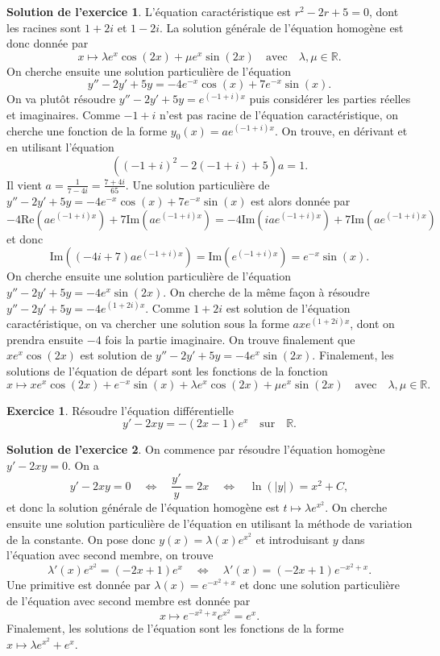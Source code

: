 \documentclass[a4paper, 11pt,openany]{article}%
\theoremstyle{plain}
\theoremstyle{definition}
\newtheorem{exo}{Exercice}
\newtheorem{sol}{Solution de l'exercice}
\theoremstyle{remark}
\newcommand{\R}{\mathbb{R}}
\begin{document}
\begin{sol}
L'équation caractéristique est $r^2-2r+5=0$, dont les racines sont $1+2i$ et $1-2i$. La solution générale de l'équation homogène est donc donnée par \[ x \mapsto \lambda e^x \cos(2x)+ \mu e^x \sin(2x) \quad \text{avec} \quad  \lambda, \mu \in \R.\]
On cherche ensuite une solution particulière de l'équation 
\[y''-2y'+5y=-4e^{-x} \cos(x)+7e^{- x} \sin(x).\]
On va plutôt résoudre $y''-2y'+5y=e^{(-1+i)x}$ puis considérer les parties réelles et imaginaires. Comme $-1+i$ n'est pas racine de l'équation caractéristique, on cherche une fonction de la forme $y_0(x)=ae^{(-1+i)x}$. On trouve, en dérivant et en utilisant l'équation 
\[ ((-1+i)^2-2(-1+i)+5)a=1.\]
Il vient $a=\frac{1}{7-4i}=\frac{7+4i}{65}$. Une solution particulière de $y''-2y'+5y=-4e^{-x} \cos(x)+7e^{-x} \sin(x)$ est alors donnée par \[ -4 \text{Re}(ae^{(-1+i)x})+7 \text{Im}(ae^{(-1+i)x})=-4 \text{Im}(iae^{(-1+i)x})+7\text{Im}(ae^{(-1+i)x})\]
et donc
\[  \text{Im}((-4i+7)ae^{(-1+i)x}) = \text{Im}(e^{(-1+i)x})=e^{-x} \sin(x).\] On cherche ensuite une solution particulière de l'équation $y''-2y' +5y= -4e^x \sin(2x)$. On cherche de la même façon à résoudre $y''-2y'+5y=-4e^{(1+2i)x}$. Comme $1+2i$ est solution de l'équation caractéristique, on va chercher une solution sous la forme $axe^{(1+2i)x}$, dont on prendra ensuite $-4$ fois la partie imaginaire. On trouve finalement que $xe^x \cos(2x)$ est solution de $y''-2y' +5y= -4e^x \sin(2x)$. Finalement, les solutions de l'équation de départ sont les fonctions de la fonction
\[ x \mapsto xe^x \cos(2x) + e^{-x} \sin(x) + \lambda e^x \cos(2x) + \mu e^{x} \sin(2x) \quad \text{avec} \quad \lambda, \mu \in \R.\]
\end{sol}


\begin{exo}
Résoudre l'équation différentielle
\[ y'-2xy = -(2x-1)e^x \quad \text{sur} \quad \R.\]
\end{exo}

\begin{sol}
On commence par résoudre l'équation homogène $y'-2xy=0$. On a 
\[ y'- 2xy=0 \quad \Leftrightarrow \quad \frac{y'}{y} =2x \quad \Leftrightarrow \quad \ln(|y|)=x^2+C,\]
et donc la solution générale de l'équation homogène est $t \mapsto \lambda e^{x^2}$. On cherche ensuite une solution particulière de l'équation en utilisant la méthode de variation de la constante. On pose donc $y(x)= \lambda(x)e^{x^2}$ et introduisant $y$ dans l'équation avec second membre, on trouve 
\[ \lambda'(x)e^{x^2} = (-2x+1)e^x \quad \Leftrightarrow \quad \lambda'(x) = (-2x+1)e^{-x^2+x}.\]
Une primitive est donnée par $\lambda(x)=e^{-x^2+x}$ et donc une solution particulière de l'équation avec second membre est donnée par \[ x \mapsto  e^{-x^2+x}e^{x^2}=e^x.\]
Finalement, les solutions de l'équation sont les fonctions de la forme $x \mapsto \lambda e^{x^2}+e^x$. 
\end{sol}
\end{document}
